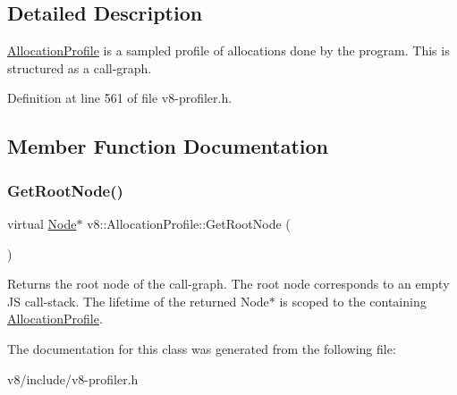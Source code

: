 \subsection{Detailed Description}
\mbox{\hyperlink{classv8_1_1AllocationProfile}{Allocation\+Profile}} is a sampled profile of allocations done by the program. This is structured as a call-\/graph. 

Definition at line 561 of file v8-\/profiler.\+h.



\subsection{Member Function Documentation}
\mbox{\label{classv8_1_1AllocationProfile_afea045dae30df5477088e2f0b7edb6c4}} 
\subsubsection{\texorpdfstring{Get\+Root\+Node()}{GetRootNode()}}
{\footnotesize\ttfamily virtual \mbox{\hyperlink{structv8_1_1AllocationProfile_1_1Node}{Node}}$\ast$ v8\+::\+Allocation\+Profile\+::\+Get\+Root\+Node (\begin{DoxyParamCaption}{ }\end{DoxyParamCaption})\hspace{0.3cm}{\ttfamily [pure virtual]}}

Returns the root node of the call-\/graph. The root node corresponds to an empty JS call-\/stack. The lifetime of the returned Node$\ast$ is scoped to the containing \mbox{\hyperlink{classv8_1_1AllocationProfile}{Allocation\+Profile}}. 

The documentation for this class was generated from the following file\+:\begin{DoxyCompactItemize}
\item 
v8/include/v8-\/profiler.\+h\end{DoxyCompactItemize}

